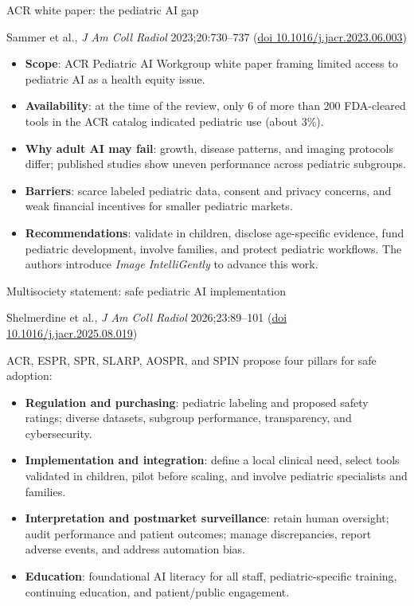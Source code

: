 \documentclass[aspectratio=169]{beamer}
\begin{document}
\begin{frame}[category=Journals]{ACR white paper: the pediatric AI gap}
\relax
{\scriptsize Sammer et al., \textit{J Am Coll Radiol} 2023;20:730--737
(\href{https://doi.org/10.1016/j.jacr.2023.06.003}{doi 10.1016/j.jacr.2023.06.003})\par}
\medskip
\small
\begin{itemize}
  \item \textbf{Scope}: ACR Pediatric AI Workgroup white paper framing limited access to pediatric AI as a health equity issue.
  \item \textbf{Availability}: at the time of the review, only 6 of more than 200 FDA-cleared tools in the ACR catalog indicated pediatric use (about 3\%).
  \item \textbf{Why adult AI may fail}: growth, disease patterns, and imaging protocols differ; published studies show uneven performance across pediatric subgroups.
  \item \textbf{Barriers}: scarce labeled pediatric data, consent and privacy concerns, and weak financial incentives for smaller pediatric markets.
  \item \textbf{Recommendations}: validate in children, disclose age-specific evidence, fund pediatric development, involve families, and protect pediatric workflows. The authors introduce \textit{Image IntelliGently} to advance this work.
\end{itemize}
\end{frame}

\begin{frame}[category=Journals]{Multisociety statement: safe pediatric AI implementation}
\relax
{\scriptsize Shelmerdine et al., \textit{J Am Coll Radiol} 2026;23:89--101
(\href{https://doi.org/10.1016/j.jacr.2025.08.019}{doi 10.1016/j.jacr.2025.08.019})\par}
\medskip
{\small ACR, ESPR, SPR, SLARP, AOSPR, and SPIN propose four pillars for safe adoption:\par}
\small
\begin{itemize}
  \item \textbf{Regulation and purchasing}: pediatric labeling and proposed safety ratings; diverse datasets, subgroup performance, transparency, and cybersecurity.
  \item \textbf{Implementation and integration}: define a local clinical need, select tools validated in children, pilot before scaling, and involve pediatric specialists and families.
  \item \textbf{Interpretation and postmarket surveillance}: retain human oversight; audit performance and patient outcomes; manage discrepancies, report adverse events, and address automation bias.
  \item \textbf{Education}: foundational AI literacy for all staff, pediatric-specific training, continuing education, and patient/public engagement.
\end{itemize}
\end{frame}
\end{document}

